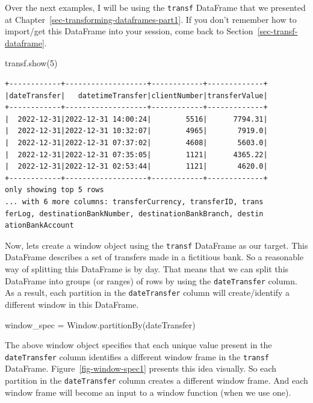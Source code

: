 \documentclass[
  11pt,
  letterpaper,
  DIV=11,
  numbers=noendperiod]{scrreprt}
\newenvironment{Shaded}{\begin{snugshade}}{\end{snugshade}}
\newcommand{\DecValTok}[1]{\textcolor[rgb]{0.68,0.00,0.00}{#1}}
\newcommand{\NormalTok}[1]{\textcolor[rgb]{0.00,0.23,0.31}{#1}}
\newcommand{\OperatorTok}[1]{\textcolor[rgb]{0.37,0.37,0.37}{#1}}
\newcommand{\StringTok}[1]{\textcolor[rgb]{0.13,0.47,0.30}{#1}}
\begin{document}
Over the next examples, I will be using the \texttt{transf} DataFrame
that we presented at Chapter~\ref{sec-transforming-dataframes-part1}. If
you don't remember how to import/get this DataFrame into your session,
come back to Section~\ref{sec-transf-dataframe}.

\begin{Shaded}
\begin{Highlighting}[]
\NormalTok{transf.show(}\DecValTok{5}\NormalTok{)}
\end{Highlighting}
\end{Shaded}

\begin{verbatim}
+------------+-------------------+------------+-------------+
|dateTransfer|   datetimeTransfer|clientNumber|transferValue|
+------------+-------------------+------------+-------------+
|  2022-12-31|2022-12-31 14:00:24|        5516|      7794.31|
|  2022-12-31|2022-12-31 10:32:07|        4965|       7919.0|
|  2022-12-31|2022-12-31 07:37:02|        4608|       5603.0|
|  2022-12-31|2022-12-31 07:35:05|        1121|      4365.22|
|  2022-12-31|2022-12-31 02:53:44|        1121|       4620.0|
+------------+-------------------+------------+-------------+
only showing top 5 rows
... with 6 more columns: transferCurrency, transferID, trans
ferLog, destinationBankNumber, destinationBankBranch, destin
ationBankAccount
\end{verbatim}

Now, lets create a window object using the \texttt{transf} DataFrame as
our target. This DataFrame describes a set of transfers made in a
fictitious bank. So a reasonable way of splitting this DataFrame is by
day. That means that we can split this DataFrame into groups (or ranges)
of rows by using the \texttt{dateTransfer} column. As a result, each
partition in the \texttt{dateTransfer} column will create/identify a
different window in this DataFrame.

\begin{Shaded}
\begin{Highlighting}[]
\NormalTok{window\_spec }\OperatorTok{=}\NormalTok{ Window.partitionBy(}\StringTok{\textquotesingle{}dateTransfer\textquotesingle{}}\NormalTok{)}
\end{Highlighting}
\end{Shaded}

The above window object specifies that each unique value present in the
\texttt{dateTransfer} column identifies a different window frame in the
\texttt{transf} DataFrame. Figure~\ref{fig-window-spec1} presents this
idea visually. So each partition in the \texttt{dateTransfer} column
creates a different window frame. And each window frame will become an
input to a window function (when we use one).
\end{document}
